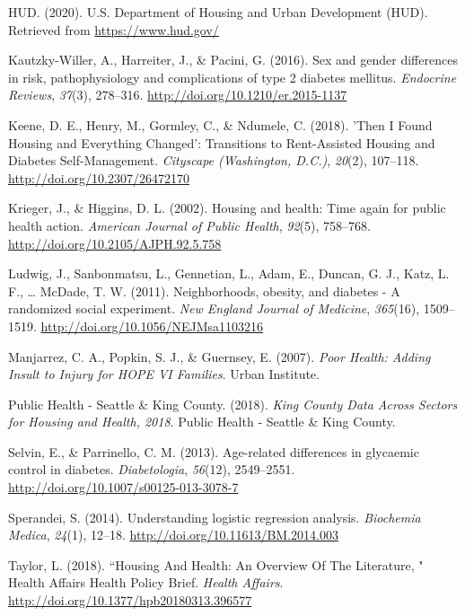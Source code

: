 \documentclass [11pt, proquest] {uwthesis}[2015/03/03]
\begin{document}
\hypertarget{ref-HUD2020}{}
HUD. (2020). U.S. Department of Housing and Urban Development (HUD).
Retrieved from \url{https://www.hud.gov/}

\hypertarget{ref-Kautzky-Willer2016}{}
Kautzky-Willer, A., Harreiter, J., \& Pacini, G. (2016). Sex and gender
differences in risk, pathophysiology and complications of type 2
diabetes mellitus. \emph{Endocrine Reviews}, \emph{37}(3), 278--316.
\url{http://doi.org/10.1210/er.2015-1137}

\hypertarget{ref-Keene2018}{}
Keene, D. E., Henry, M., Gormley, C., \& Ndumele, C. (2018). 'Then I
Found Housing and Everything Changed': Transitions to Rent-Assisted
Housing and Diabetes Self-Management. \emph{Cityscape (Washington,
D.C.)}, \emph{20}(2), 107--118. \url{http://doi.org/10.2307/26472170}

\hypertarget{ref-Krieger2002}{}
Krieger, J., \& Higgins, D. L. (2002). Housing and health: Time again
for public health action. \emph{American Journal of Public Health},
\emph{92}(5), 758--768. \url{http://doi.org/10.2105/AJPH.92.5.758}

\hypertarget{ref-Ludwig2011}{}
Ludwig, J., Sanbonmatsu, L., Gennetian, L., Adam, E., Duncan, G. J.,
Katz, L. F., \ldots{} McDade, T. W. (2011). Neighborhoods, obesity, and
diabetes - A randomized social experiment. \emph{New England Journal of
Medicine}, \emph{365}(16), 1509--1519.
\url{http://doi.org/10.1056/NEJMsa1103216}

\hypertarget{ref-Manjarrez2007}{}
Manjarrez, C. A., Popkin, S. J., \& Guernsey, E. (2007). \emph{Poor
Health: Adding Insult to Injury for HOPE VI Families}. Urban Institute.

\hypertarget{ref-PHSKC2018}{}
Public Health - Seattle \& King County. (2018). \emph{King County Data
Across Sectors for Housing and Health, 2018}. Public Health - Seattle \&
King County.

\hypertarget{ref-Selvin2013}{}
Selvin, E., \& Parrinello, C. M. (2013). Age-related differences in
glycaemic control in diabetes. \emph{Diabetologia}, \emph{56}(12),
2549--2551. \url{http://doi.org/10.1007/s00125-013-3078-7}

\hypertarget{ref-Sperandei2014}{}
Sperandei, S. (2014). Understanding logistic regression analysis.
\emph{Biochemia Medica}, \emph{24}(1), 12--18.
\url{http://doi.org/10.11613/BM.2014.003}

\hypertarget{ref-Taylor2018}{}
Taylor, L. (2018). ``Housing And Health: An Overview Of The Literature,
" Health Affairs Health Policy Brief. \emph{Health Affairs}.
\url{http://doi.org/10.1377/hpb20180313.396577}
\end{document}

